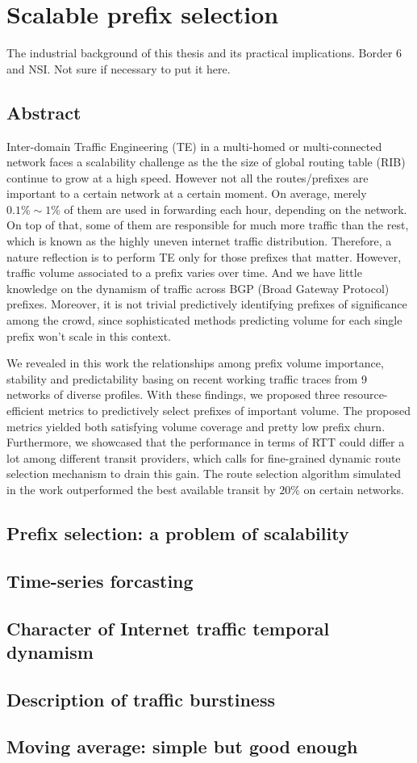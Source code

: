 \chapter{Scalable prefix selection}
The industrial background of this thesis and its practical implications.
Border 6 and NSI. Not sure if necessary to put it here.

\section*{Abstract}
Inter-domain Traffic Engineering (TE) in a multi-homed or multi-connected network faces a scalability challenge as the the size of global routing table (RIB) continue to grow at a high speed. However not all the routes/prefixes are important to a certain network at a certain moment. On average, merely $0.1\% \sim 1\%$ of them are used in forwarding each hour, depending on the network. On top of that, some of them are responsible for much more traffic than the rest, which is known as the highly uneven internet traffic distribution.
Therefore, a nature reflection is to perform TE only for those prefixes that matter.
However, traffic volume associated to a prefix varies over time. And we have little knowledge on the dynamism of traffic across BGP (Broad Gateway Protocol) prefixes. 
Moreover, it is not trivial predictively identifying prefixes of significance among the crowd, since sophisticated methods predicting volume for each single prefix won't scale in this context.

We revealed in this work the relationships among prefix volume importance, stability and predictability basing on recent working traffic traces from 9 networks of diverse profiles. 
With these findings, we proposed three resource-efficient metrics to predictively select prefixes of important volume. The proposed metrics yielded both satisfying volume coverage and pretty low prefix churn. Furthermore, we showcased that the performance in terms of RTT could differ a lot among different transit providers, which calls for fine-grained dynamic route selection mechanism to drain this gain. The route selection algorithm simulated in the work outperformed the best available transit by $20\%$ on certain networks. 

\section{Prefix selection: a problem of scalability}

\section{Time-series forcasting}

\section{Character of Internet traffic temporal dynamism}

\section{Description of traffic burstiness}

\section{Moving average: simple but good enough}
